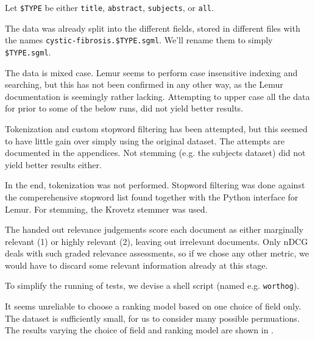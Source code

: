 Let \lstinline|$TYPE| be either \lstinline$title$, \lstinline$abstract$,
\lstinline$subjects$, or \lstinline$all$.

The data was already split into the different fields, stored in different files
with the names \lstinline|cystic-fibrosis.$TYPE.sgml|. We'll rename them to
simply \lstinline|$TYPE.sgml|.

The data is mixed case. Lemur seems to perform case insensitive indexing and
searching, but this has not been confirmed in any other way, as the Lemur
documentation is seemingly rather lacking. Attempting to upper case all the
data for prior to some of the below runs, did not yield better results.

Tokenization and custom stopword filtering has been attempted, but this seemed
to have little gain over simply using the original dataset. The attempts are
documented in the appendices. Not stemming (e.g. the subjects dataset) did not
yield better results either.

In the end, tokenization was not performed.  Stopword filtering was done
against the comperehensive stopword list found together with the Python
interface for Lemur. For stemming, the Krovetz stemmer was used.

The handed out relevance judgements score each document as either marginally
relevant (1) or highly relevant (2), leaving out irrelevant documents. Only
nDCG deals with such graded relevance assessments, so if we chose any other
metric, we would have to discard some relevant information already at this
stage.

To simplify the running of tests, we devise a shell script (named e.g.
\lstinline|worthog|).



It seems unreliable to choose a ranking model based on one choice of field
only. The dataset is sufficiently small, for us to consider many possible
permuations. The results varying the choice of field and ranking model are
shown in .

